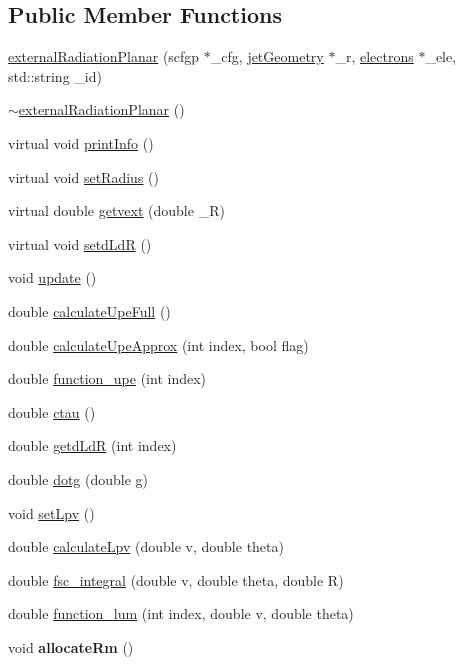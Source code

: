 \subsection*{Public Member Functions}
\begin{DoxyCompactItemize}
\item 
\hyperlink{classexternalRadiationPlanar_a6254e3256914a093886b7af1f1dc4876}{external\-Radiation\-Planar} (scfgp $\ast$\-\_\-cfg, \hyperlink{classjetGeometry}{jet\-Geometry} $\ast$\-\_\-r, \hyperlink{classelectrons}{electrons} $\ast$\-\_\-ele, std\-::string \-\_\-id)
\item 
\hyperlink{classexternalRadiationPlanar_aab75f84c763bf0fb133ba3a3c5f0341c}{$\sim$external\-Radiation\-Planar} ()
\item 
virtual void \hyperlink{classexternalRadiationPlanar_a47e497b12dfa4e71311bffb3a4b384b2}{print\-Info} ()
\item 
virtual void \hyperlink{classexternalRadiationPlanar_a710859cda6258d75098ccb31e60ab261}{set\-Radius} ()
\item 
virtual double \hyperlink{classexternalRadiationPlanar_aa9ea7f37d1e43219f71ec6b215a38b96}{getvext} (double \-\_\-\-R)
\item 
virtual void \hyperlink{classexternalRadiationPlanar_a7914df2de2d822755ac1c9e6d860e22b}{setd\-Ld\-R} ()
\item 
void \hyperlink{classexternalRadiationPlanar_acfddae49394d11c89d1d47229ba8a3f7}{update} ()
\item 
double \hyperlink{classexternalRadiationPlanar_a14eca037d735b9cd1ad6d8f433052c62}{calculate\-Upe\-Full} ()
\item 
double \hyperlink{classexternalRadiationPlanar_a963d1270de3666c72509d5b1d405d72a}{calculate\-Upe\-Approx} (int index, bool flag)
\item 
double \hyperlink{classexternalRadiationPlanar_a90d75353e72674994f5a00d9de745f38}{function\-\_\-upe} (int index)
\item 
double \hyperlink{classexternalRadiationPlanar_a351a13f462898c59bae55ce606829648}{ctau} ()
\item 
double \hyperlink{classexternalRadiationPlanar_a7facfb7bbb0dfa8586ec30ae6d293aab}{getd\-Ld\-R} (int index)
\item 
double \hyperlink{classexternalRadiationPlanar_a4f49eec94e9d935df18534fe021c750c}{dotg} (double g)
\item 
void \hyperlink{classexternalRadiationPlanar_a8023104635baec445f038e9f1ca6c3bc}{set\-Lpv} ()
\item 
double \hyperlink{classexternalRadiationPlanar_a82753cf790d39965e72c07818a1bfa5e}{calculate\-Lpv} (double v, double theta)
\item 
double \hyperlink{classexternalRadiationPlanar_aaebb696a7bc742d22f9f8aadbcb4faaf}{fsc\-\_\-integral} (double v, double theta, double R)
\item 
double \hyperlink{classexternalRadiationPlanar_ab8c43b04bfea46ca0bc5e122ee12cc32}{function\-\_\-lum} (int index, double v, double theta)
\item 
\hypertarget{classexternalRadiationPlanar_aacba4508f03b16a8b19246cb6cb41eaa}{void {\bfseries allocate\-Rm} ()}\label{classexternalRadiationPlanar_aacba4508f03b16a8b19246cb6cb41eaa}


\end{DoxyCompactItemize}
